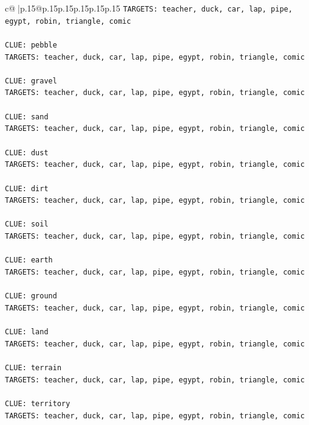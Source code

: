 \documentclass{article}
\begin{document}
{\begin{supertabular}{c@{$\;$}|p{.15\linewidth}@{}p{.15\linewidth}p{.15\linewidth}p{.15\linewidth}p{.15\linewidth}p{.15\linewidth}}
{{{\texttt{TARGETS: teacher, duck, car, lap, pipe, egypt, robin, triangle, comic} \\
\\ 
\texttt{CLUE: pebble} \\
\texttt{TARGETS: teacher, duck, car, lap, pipe, egypt, robin, triangle, comic} \\
\\ 
\texttt{CLUE: gravel} \\
\texttt{TARGETS: teacher, duck, car, lap, pipe, egypt, robin, triangle, comic} \\
\\ 
\texttt{CLUE: sand} \\
\texttt{TARGETS: teacher, duck, car, lap, pipe, egypt, robin, triangle, comic} \\
\\ 
\texttt{CLUE: dust} \\
\texttt{TARGETS: teacher, duck, car, lap, pipe, egypt, robin, triangle, comic} \\
\\ 
\texttt{CLUE: dirt} \\
\texttt{TARGETS: teacher, duck, car, lap, pipe, egypt, robin, triangle, comic} \\
\\ 
\texttt{CLUE: soil} \\
\texttt{TARGETS: teacher, duck, car, lap, pipe, egypt, robin, triangle, comic} \\
\\ 
\texttt{CLUE: earth} \\
\texttt{TARGETS: teacher, duck, car, lap, pipe, egypt, robin, triangle, comic} \\
\\ 
\texttt{CLUE: ground} \\
\texttt{TARGETS: teacher, duck, car, lap, pipe, egypt, robin, triangle, comic} \\
\\ 
\texttt{CLUE: land} \\
\texttt{TARGETS: teacher, duck, car, lap, pipe, egypt, robin, triangle, comic} \\
\\ 
\texttt{CLUE: terrain} \\
\texttt{TARGETS: teacher, duck, car, lap, pipe, egypt, robin, triangle, comic} \\
\\ 
\texttt{CLUE: territory} \\
\texttt{TARGETS: teacher, duck, car, lap, pipe, egypt, robin, triangle, comic} \\
}}}
\end{supertabular}}
\end{document}
